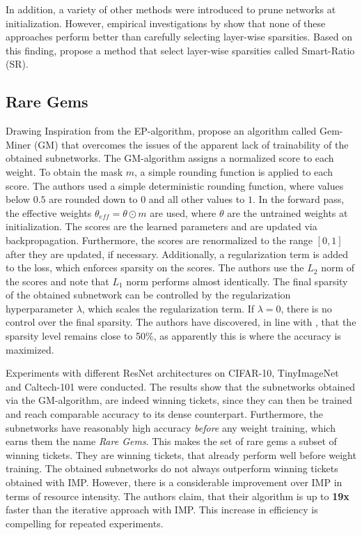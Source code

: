 In addition, a variety of other methods \autocite{GraSP,SNIP,SynFlow} were introduced to prune networks at initialization. However, empirical investigations by \textcite{PruningAtInitMissingTheMark, SanityCheckingPruningMethods} show that none of these approaches perform better than carefully selecting layer-wise sparsities.
Based on this finding, \autocite{SanityCheckingPruningMethods} propose a method that select layer-wise sparsities called Smart-Ratio (SR).

\subsection{Rare Gems}
Drawing Inspiration from the EP-algorithm, \textcite{RareGems} propose an algorithm called Gem-Miner (GM) that overcomes the issues of the apparent lack of trainability of the obtained subnetworks.
The GM-algorithm assigns a normalized score to each weight. 
To obtain the mask $m$, a simple rounding function is applied to each score. The authors used a simple deterministic rounding function, where values below $0.5$ are rounded down to $0$ and all other values to $1$.
In the forward pass, the effective weights $\theta_{eff} = \theta \odot m$ are used, where $\theta$ are the untrained weights at initialization. 
The scores are the learned parameters and are updated via backpropagation.
Furthermore, the scores are renormalized to the range $[0,1]$ after they are updated, if necessary.
Additionally, a regularization term is added to the loss, which enforces sparsity on the scores. 
The authors use the $L_2$ norm of the scores and note that $L_1$ norm performs almost identically.
The final sparsity of the obtained subnetwork can be controlled by the regularization hyperparameter $\lambda$, which scales the regularization term.
 If $\lambda = 0$, there is no control over the final sparsity. 
 The authors have discovered, in line with \cite{DBLP:conf/cvpr/RamanujanWKFR20}, that the sparsity level remains close to 50\%, as apparently this is where the accuracy is maximized.

Experiments with different ResNet architectures on CIFAR-10, TinyImageNet \autocite{Tinyimagenet} and Caltech-101 \autocite{Caltech101} were conducted. 
The results show that the subnetworks obtained via the GM-algorithm, are indeed winning tickets, since they can then be trained and reach comparable accuracy to its dense counterpart.
Furthermore, the subnetworks have reasonably high accuracy \textit{before} any weight training, which earns them the name \textit{Rare Gems}. 
This makes the set of rare gems a subset of winning tickets. 
They are winning tickets, that already perform well before weight training.
The obtained subnetworks do not always outperform winning tickets obtained with IMP. 
However, there is a considerable improvement over IMP in terms of resource intensity.
The authors claim, that their algorithm is up to \textbf{19x} faster than the iterative approach with IMP. 
This increase in efficiency is compelling for repeated experiments.

